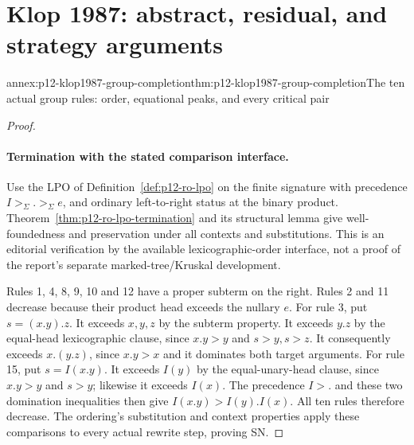 \section{Klop 1987: abstract, residual, and strategy arguments}

\begin{annexitem}{annex:p12-klop1987-group-completion}{thm:p12-klop1987-group-completion}{The ten actual group rules: order, equational peaks, and every critical pair}
\begin{proof}
\paragraph{Termination with the stated comparison interface.}
Use the LPO of Definition~\ref{def:p12-ro-lpo} on the finite signature
with precedence \(I>_\Sigma .>_\Sigma e\), and ordinary left-to-right
status at the binary product. Theorem~\ref{thm:p12-ro-lpo-termination}
and its structural lemma give well-foundedness and preservation under
all contexts and substitutions. This is an editorial verification by
the available lexicographic-order interface, not a proof of the
report's separate marked-tree/Kruskal development.

Rules 1, 4, 8, 9, 10 and 12 have a proper subterm on the right.
Rules 2 and 11 decrease because their product head exceeds the
nullary \(e\). For rule 3, put \(s=(x.y).z\).
It exceeds \(x,y,z\) by the subterm property. It exceeds \(y.z\)
by the equal-head lexicographic clause, since \(x.y>y\) and
\(s>y,s>z\). It consequently exceeds \(x.(y.z)\), since
\(x.y>x\) and it dominates both target arguments.
For rule 15, put \(s=I(x.y)\).
It exceeds \(I(y)\) by the equal-unary-head clause, since
\(x.y>y\) and \(s>y\); likewise it exceeds \(I(x)\).
The precedence \(I>.\) and these two domination inequalities then
give \(I(x.y)>I(y).I(x)\). All ten rules therefore decrease.
The ordering's substitution and context properties apply these
comparisons to every actual rewrite step, proving SN.


\end{proof}
\end{annexitem}
